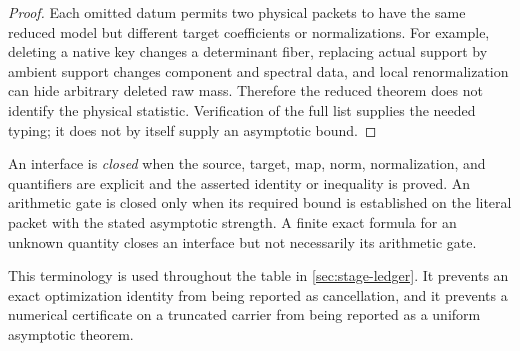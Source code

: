 \begin{proof}
Each omitted datum permits two physical packets to have the same
reduced model but different target coefficients or normalizations.
For example, deleting a native key changes a determinant fiber,
replacing actual support by ambient support changes component and
spectral data, and local renormalization can hide arbitrary deleted
raw mass.  Therefore the reduced theorem does not identify the
physical statistic.  Verification of the full list supplies the
needed typing; it does not by itself supply an asymptotic bound.
\end{proof}

\begin{definition}
\label{def:closed-gates}
An interface is \emph{closed} when the source, target, map, norm,
normalization, and quantifiers are explicit and the asserted
identity or inequality is proved.  An arithmetic gate is closed only
when its required bound is established on the literal packet with the
stated asymptotic strength.  A finite exact formula for an unknown
quantity closes an interface but not necessarily its arithmetic gate.
\end{definition}

This terminology is used throughout the table in
\cref{sec:stage-ledger}.  It prevents an exact optimization identity
from being reported as cancellation, and it prevents a numerical
certificate on a truncated carrier from being reported as a uniform
asymptotic theorem.

